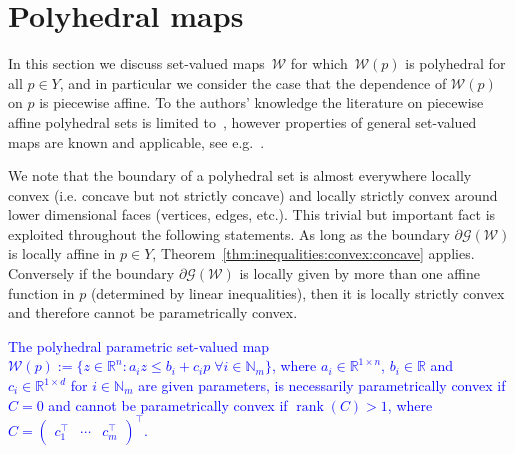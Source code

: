 \documentclass[smallextended]{svjour3}       %
\numberwithin{equation}{section}
\DeclareMathOperator{\rank}{rank}
\newcommand{\revision}[1]{\textcolor{blue}{#1}}
\begin{document}
\section{Polyhedral maps}\label{sec:polyhedral:maps}
%
%
%
%
In this section we discuss set-valued maps~$\mathcal W$ for which~$\mathcal W(p)$ is polyhedral for all $p\in Y$, and in particular we consider the case that the dependence of $\mathcal W(p)$ on $p$ is piecewise affine. 
%
To the authors' knowledge the literature on piecewise affine polyhedral sets is limited to~\cite{Finzel:2000}, however properties of general set-valued maps are known and applicable, see e.g.~\cite{Aubin:2009}.
%

\begin{remark}
We note that the boundary of a polyhedral set is almost everywhere locally convex (i.e. concave but not strictly concave) and locally strictly convex around lower dimensional faces (vertices, edges, etc.).
%
This trivial but important fact is exploited throughout the following statements. 
%
As long as the boundary $\partial\mathscr G(\mathcal W)$ is locally affine in $p\in Y$, Theorem~\ref{thm:inequalities:convex:concave} applies. 
%
Conversely if the boundary $\partial\mathscr G(\mathcal W)$ is locally given by more than one affine function in $p$ (determined by linear inequalities), then it is locally strictly convex and therefore cannot be parametrically convex.
\end{remark}
%
\begin{theorem}\label{thm:polytopic:set:not:p:convex}
  \revision{The polyhedral parametric set-valued map $\mathcal W(p):=\{z\in \mathbb R^n : a_i z \leq b_i  + c_i p \; \forall i\in\mathbb N_m\}$, where $a_i\in\mathbb R^{1\times n}$, $b_i \in \mathbb R$ and $c_i \in \mathbb R^{1\times d}$ for $i\in\mathbb N_m$ are given parameters, is necessarily parametrically convex if $C=0$ and cannot be parametrically convex if $\rank( C ) > 1$, where $C = (\begin{matrix} c_1^\top & \cdots & c_m^\top\end{matrix})^\top$.}
\end{theorem}
%
\end{document}
